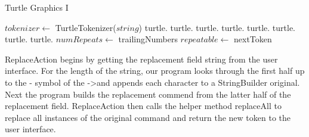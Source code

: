 \documentclass[12pt]{article}
\begin{document}
\begin{algorithm}[H]
\caption{Turtle Graphics I}
\begin{algorithmic}
        \State $tokenizer \gets$ TurtleTokenizer($string$)
                    \State turtle.
                \Else
                    \State turtle.
                \EndIf
                    \State turtle.
                \Else
                    \State turtle.
                \EndIf
                    \State turtle.
                \Else
                    \State turtle.
                \EndIf
                \State turtle.
                \State turtle.
                \State $numRepeats \gets$ trailingNumbers
                \State $repeatable \gets$ nextToken
                    \State {}
                \EndFor
            \EndIf
        \EndWhile
    \EndProcedure
\end{algorithmic}
\end{algorithm}

ReplaceAction begins by getting the replacement field string from the user interface.
For the length of the string, our program looks through the first half up to the -
symbol of the -\textgreater and appends each character to a StringBuilder original.
 Next the program builds the replacement commend from the latter half of the replacement field.
 ReplaceAction then calls the helper method replaceAll to replace all instances of the original
 command and return the new token to the user interface.
\end{document}
